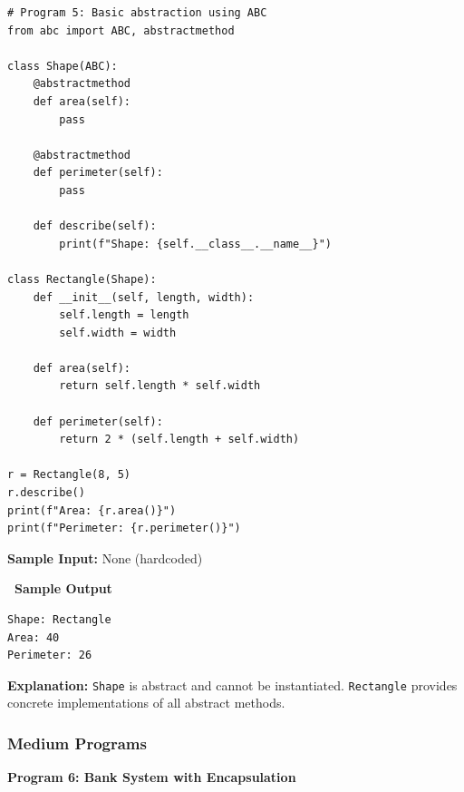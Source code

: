 \documentclass[12pt,a4paper]{article}
\newcommand{\outhead}{\noindent\colorbox{cmrgreen!25}%
  {\textbf{\small\color{cmrdark}~Sample Output~}}\par\vspace{-1pt}}
\begin{document}
\begin{lstlisting}
# Program 5: Basic abstraction using ABC
from abc import ABC, abstractmethod

class Shape(ABC):
    @abstractmethod
    def area(self):
        pass

    @abstractmethod
    def perimeter(self):
        pass

    def describe(self):
        print(f"Shape: {self.__class__.__name__}")

class Rectangle(Shape):
    def __init__(self, length, width):
        self.length = length
        self.width = width

    def area(self):
        return self.length * self.width

    def perimeter(self):
        return 2 * (self.length + self.width)

r = Rectangle(8, 5)
r.describe()
print(f"Area: {r.area()}")
print(f"Perimeter: {r.perimeter()}")
\end{lstlisting}

\textbf{Sample Input:} None (hardcoded)

\outhead
\begin{lstlisting}[style=outputstyle]
Shape: Rectangle
Area: 40
Perimeter: 26
\end{lstlisting}

\textbf{Explanation:} \texttt{Shape} is abstract and cannot be instantiated. \texttt{Rectangle} provides concrete implementations of all abstract methods.

\subsubsection{Medium Programs}

\textbf{Program 6: Bank System with Encapsulation}
\end{document}
